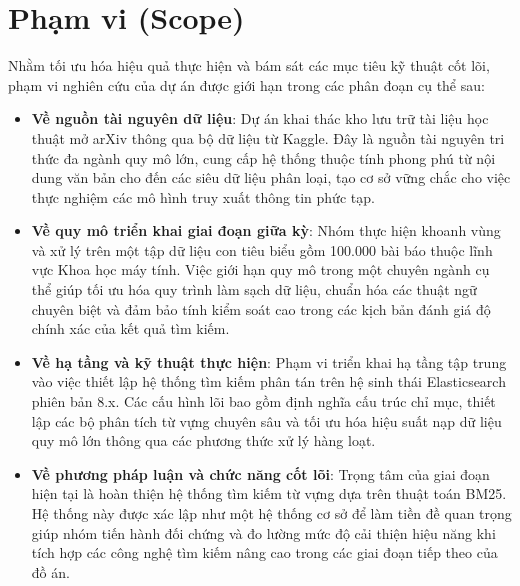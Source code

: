 \section{Phạm vi (Scope)}
Nhằm tối ưu hóa hiệu quả thực hiện và bám sát các mục tiêu kỹ thuật cốt lõi, phạm vi nghiên cứu của dự án được giới hạn trong các phân đoạn cụ thể sau:
\begin{itemize}
    \item \textbf{Về nguồn tài nguyên dữ liệu}: Dự án khai thác kho lưu trữ tài liệu học thuật mở arXiv thông qua bộ dữ liệu từ Kaggle. Đây là nguồn tài nguyên tri thức đa ngành quy mô lớn, cung cấp hệ thống thuộc tính phong phú từ nội dung văn bản cho đến các siêu dữ liệu phân loại, tạo cơ sở vững chắc cho việc thực nghiệm các mô hình truy xuất thông tin phức tạp.
    \item \textbf{Về quy mô triển khai giai đoạn giữa kỳ}: Nhóm thực hiện khoanh vùng và xử lý trên một tập dữ liệu con tiêu biểu gồm 100.000 bài báo thuộc lĩnh vực Khoa học máy tính. Việc giới hạn quy mô trong một chuyên ngành cụ thể giúp tối ưu hóa quy trình làm sạch dữ liệu, chuẩn hóa các thuật ngữ chuyên biệt và đảm bảo tính kiểm soát cao trong các kịch bản đánh giá độ chính xác của kết quả tìm kiếm.
    \item \textbf{Về hạ tầng và kỹ thuật thực hiện}: Phạm vi triển khai hạ tầng tập trung vào việc thiết lập hệ thống tìm kiếm phân tán trên hệ sinh thái Elasticsearch phiên bản 8.x. Các cấu hình lõi bao gồm định nghĩa cấu trúc chỉ mục, thiết lập các bộ phân tích từ vựng chuyên sâu và tối ưu hóa hiệu suất nạp dữ liệu quy mô lớn thông qua các phương thức xử lý hàng loạt.
    \item \textbf{Về phương pháp luận và chức năng cốt lõi}: Trọng tâm của giai đoạn hiện tại là hoàn thiện hệ thống tìm kiếm từ vựng dựa trên thuật toán BM25. Hệ thống này được xác lập như một hệ thống cơ sở để làm tiền đề quan trọng giúp nhóm tiến hành đối chứng và đo lường mức độ cải thiện hiệu năng khi tích hợp các công nghệ tìm kiếm nâng cao trong các giai đoạn tiếp theo của đồ án.
\end{itemize}
